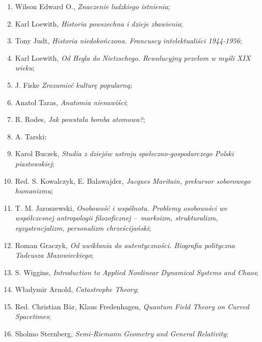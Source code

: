 \documentclass[a4paper,11pt]{article}
\begin{document}
\begin{enumerate}
\item Wilson Edward O., \textit{Znaczenie ludzkiego istnienia};

\item Karl Loewith, \textit{Historia powszechna i dzieje zbawienia};

\item Tony Judt, \textit{Historia niedokończona. Francuscy
    intelektualiści 1944-1956};

\item Karl Loewith, \textit{Od Hegla do Nietzschego. Rewolucyjny przełom
    w myśli XIX wieku};

\item J. Fiske \textit{Zrozumieć kulturę popularną};

\item Anatol Taras, \textit{Anatomia nienawiści};

\item R. Rodes, \textit{Jak powstała bomba atomowa?};

\item A. Tarski;

\item Karol Buczek, \textit{Studia z dziejów ustroju
    społeczno-gospodarczego Polski piastowskiej};

\item Red. S. Kowalczyk, E. Balawajder, \textit{Jacques Maritain,
    prekursor soborowego humanizmu};

\item T. M. Jaroszewski, \textit{Osobowość i wspólnota. Problemy
    osobowości we współczesnej antropologii filozoficznej --~marksizm,
    strukturalizm, egzystencjalizm, personalizm chrześcijański};

\item Roman Graczyk, \textit{Od uwikłania do autentyczności. Biografia
    polityczna Tadeusza Mazowieckiego};

\item S. Wiggins, \textit{Introduction to Applied Nonlinear Dynamical
    Systems and Chaos};

\item Władymir Arnold, \textit{Catastrophe Theory};

\item Red. Christian B\"{a}r, Klaus Fredenhagen, \textit{Quantum Field
    Theory on Curved Spacetimes};

\item Sholmo Sternberg, \textit{Semi-Riemann Geometry and General
    Relativity};


\end{enumerate}
\end{document}

